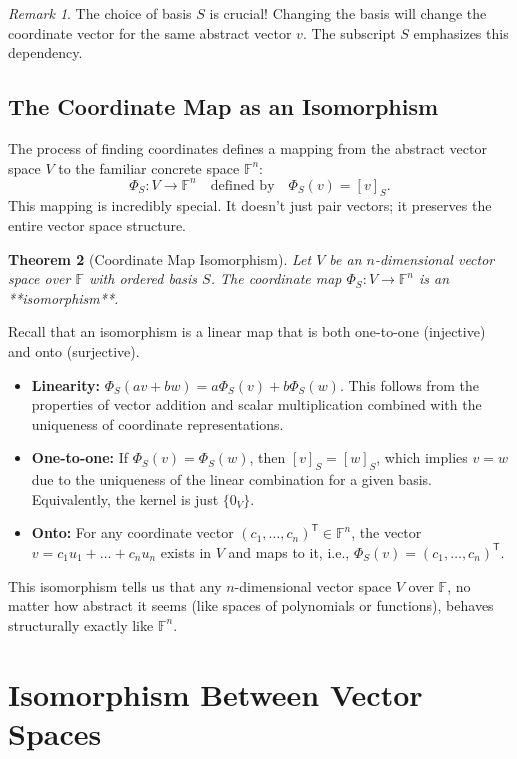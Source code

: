 \documentclass[11pt]{article}
\newtheorem{theorem}{Theorem}[section]
\theoremstyle{definition}
\theoremstyle{remark}
\newtheorem{remark}[theorem]{Remark}
\newcommand{\F}{\mathbb{F}}
\newcommand{\Fn}[1]{\F^{#1}}
\newcommand{\coord}[2]{[#1]_{#2}} %
\newcommand{\tr}{^\mathsf{T}} %
\begin{document}
\begin{remark}
    The choice of basis $S$ is crucial! Changing the basis will change the coordinate vector for the same abstract vector $v$. The subscript $S$ emphasizes this dependency.
\end{remark}

\subsection{The Coordinate Map as an Isomorphism}

The process of finding coordinates defines a mapping from the abstract vector space $V$ to the familiar concrete space $\Fn{n}$:
\[ \Phi_S: V \to \Fn{n} \quad \text{defined by} \quad \Phi_S(v) = \coord{v}{S}. \]
This mapping is incredibly special. It doesn't just pair vectors; it preserves the entire vector space structure.

\begin{theorem}[Coordinate Map Isomorphism]
    Let $V$ be an $n$-dimensional vector space over $\F$ with ordered basis $S$. The coordinate map $\Phi_S: V \to \Fn{n}$ is an **isomorphism**.
\end{theorem}

Recall that an isomorphism is a linear map that is both one-to-one (injective) and onto (surjective).
\begin{itemize}
    \item \textbf{Linearity:} $\Phi_S(av + bw) = a\Phi_S(v) + b\Phi_S(w)$. This follows from the properties of vector addition and scalar multiplication combined with the uniqueness of coordinate representations.
    \item \textbf{One-to-one:} If $\Phi_S(v) = \Phi_S(w)$, then $\coord{v}{S} = \coord{w}{S}$, which implies $v=w$ due to the uniqueness of the linear combination for a given basis. Equivalently, the kernel is just $\{0_V\}$.
    \item \textbf{Onto:} For any coordinate vector $(c_1, \dots, c_n)\tr \in \Fn{n}$, the vector $v = c_1 u_1 + \dots + c_n u_n$ exists in $V$ and maps to it, i.e., $\Phi_S(v) = (c_1, \dots, c_n)\tr$.
\end{itemize}
This isomorphism tells us that any $n$-dimensional vector space $V$ over $\F$, no matter how abstract it seems (like spaces of polynomials or functions), behaves structurally exactly like $\Fn{n}$.

\section{Isomorphism Between Vector Spaces}
\end{document}
